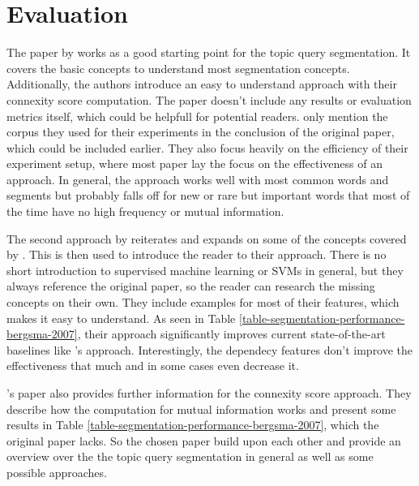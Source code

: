\section{Evaluation} \label{evaluation}

The paper by \citeauthor{Risvik:2003} works as a good starting point for the topic query segmentation. It covers the basic concepts to understand most segmentation concepts. Additionally, the authors introduce an easy to understand approach with their connexity score computation. The paper doesn't include any results or evaluation metrics itself, which could be helpfull for potential readers. \citeauthor{Risvik:2003} only mention the corpus they used for their experiments in the conclusion of the original paper, which could be included earlier. They also focus heavily on the efficiency of their experiment setup, where most paper lay the focus on the effectiveness of an approach. In general, the approach works well with most common words and segments but probably falls off for new or rare but important words that most of the time have no high frequency or mutual information.

The second approach by \citeauthor{Bergsma:2007} reiterates and expands on some of the concepts covered by \citeauthor{Risvik:2003}. This is then used to introduce the reader to their approach. There is no short introduction to supervised machine learning or SVMs in general, but they always reference the original paper, so the reader can research the missing concepts on their own. They include examples for most of their features, which makes it easy to understand. As seen in Table \ref{table-segmentation-performance-bergsma-2007}, their approach significantly improves current state-of-the-art baselines like \citeauthor{Risvik:2003}'s approach. Interestingly, the dependecy features don't improve the effectiveness that much and in some cases even decrease it.

\citeauthor{Bergsma:2007}'s paper also provides further information for the connexity score approach. They describe how the computation for mutual information works and present some results in Table \ref{table-segmentation-performance-bergsma-2007}, which the original paper lacks. So the chosen paper build upon each other and provide an overview over the the topic query segmentation in general as well as some possible approaches.
